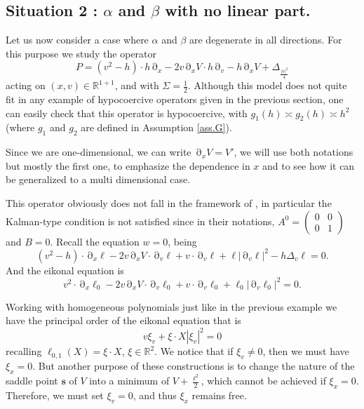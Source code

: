 \documentclass[12pt]{amsart}
\newcommand{\R}{\mathbb R}
\numberwithin{equation}{section}
\numberwithin{figure}{section}
\def\s{\mathbf{s}}
\DeclareMathOperator{\p}{\partial}
\begin{document}
\subsection{Situation 2 : $\alpha$ and $\beta$ with no linear part.}\label{ssec:nolin}

Let us now consider a case where $\alpha$ and $\beta$ are degenerate in all directions. For this purpose we study the operator
\begin{equation*}
P =  (v^2-h)\cdot h\p_x - 2v\p_xV\cdot h\p_v - h\p_xV + \Delta_{\frac{|v|^2}{4}}
\end{equation*}
acting on $(x,v)\in\R^{1+1}$, and with $\Sigma = \frac12$. Although this model does not quite fit in any example of hypocoercive operators given in the previous section, one can easily check that this operator is hypocoercive, with $g_1(h) \asymp g_2(h) \asymp h^2$ (where $g_1$ and $g_2$ are defined in Assumption \ref{ass.G}).

Since we are one-dimensional, we can write $\p_xV = V'$, we will use both notations but mostly the first one, to emphasize the dependence in $x$ and to see how it can be generalized to a multi dimensional case.

This operator obviously does not fall in the framework of \cite{BoLePMi22}, in particular the Kalman-type condition \cite[Remark 2.5]{BoLePMi22} is not satisfied since in their notations, $A^0 = \begin{pmatrix}0&0\\0&1\end{pmatrix}$ and $B = 0$. Recall the equation $w=0$, being
\begin{equation}\label{eq:w=0situ2}
(v^2-h)\cdot \p_x\ell - 2v\p_xV\cdot \p_v\ell + v\cdot\p_v\ell + \ell|\p_v\ell|^2 - h\Delta_v\ell = 0.
\end{equation}
And the eikonal equation is
\begin{equation*}
v^2\cdot \p_x\ell_0 - 2v\p_xV\cdot \p_v\ell_0 + v\cdot\p_v\ell_0 + \ell_0|\p_v\ell_0|^2 = 0.
\end{equation*}

Working with homogeneous polynomials just like in the previous example we have the principal order of the eikonal equation that is
\begin{equation*}
v\xi_v + \xi\cdot X|\xi_v|^2 = 0
\end{equation*}
recalling $\ell_{0,1}(X) = \xi\cdot X$, $\xi\in\R^2$. We notice that if $\xi_v\neq0$, then we must have $\xi_x=0$. But another purpose of these constructions is to change the nature of the saddle point $\s$ of $V$ into a minimum of $V + \frac{\ell^2}{2}$, which cannot be achieved if $\xi_x=0$. Therefore, we must set $\xi_v=0$, and thus $\xi_x$ remains free.
\end{document}
